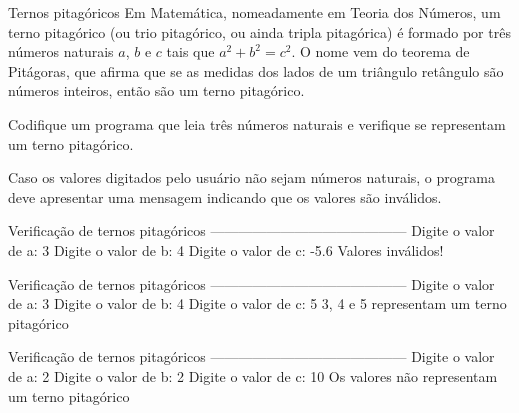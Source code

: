 \documentclass[11pt,fleqn]{practice}
\begin{document}
\begin{task}[breakable]{Ternos pitagóricos}{}
  Em Matemática, nomeadamente em Teoria dos Números, um terno pitagórico
  (ou trio pitagórico, ou ainda tripla pitagórica) é formado por três
  números naturais $a$, $b$ e $c$ tais que $a^2+b^2=c^2$. O nome vem do
  teorema de Pitágoras, que afirma que se as medidas dos lados de um
  triângulo retângulo são números inteiros, então são um terno
  pitagórico.

  Codifique um programa que leia três números naturais e verifique se
  representam um terno pitagórico.

  Caso os valores digitados pelo usuário não sejam números naturais, o
  programa deve apresentar uma mensagem indicando que os valores são
  inválidos.

  \begin{runexample}
Verificação de ternos pitagóricos
------------------------------------------
Digite o valor de a: 3
Digite o valor de b: 4
Digite o valor de c: -5.6
Valores inválidos!
  \end{runexample}

  \begin{runexample}
Verificação de ternos pitagóricos
------------------------------------------
Digite o valor de a: 3
Digite o valor de b: 4
Digite o valor de c: 5
3, 4 e 5 representam um terno pitagórico
  \end{runexample}

  \begin{runexample}
Verificação de ternos pitagóricos
------------------------------------------
Digite o valor de a: 2
Digite o valor de b: 2
Digite o valor de c: 10
Os valores não representam um terno pitagórico
  \end{runexample}

  \tcblower
  \solution
\end{task}
\end{document}
